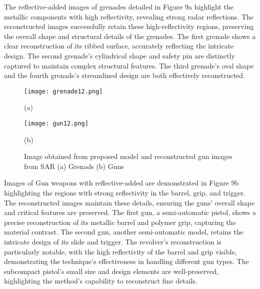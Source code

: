 \documentclass[journal,article,submit,pdftex,moreauthors]{Definitions/mdpi}
\begin{document}
The reflective-added images of grenades detailed in Figure 9a highlight the metallic components with high reflectivity, revealing strong radar reflections. The reconstructed images successfully retain these high-reflectivity regions, preserving the overall shape and structural details of the grenades. The first grenade shows a clear reconstruction of its ribbed surface, accurately reflecting the intricate design. The second grenade's cylindrical shape and safety pin are distinctly captured to maintain complex structural features. The third grenade's oval shape and the fourth grenade's streamlined design are both effectively reconstructed.





\begin{figure}[h]
    \centering
    \begin{minipage}{0.49\textwidth}
        \centering
        \texttt{[image: grenade12.png]}
        \caption*{(a)}
    \end{minipage}
    \hfill
    \begin{minipage}{0.49\textwidth}
        \centering
        \texttt{[image: gun12.png]}
        \caption*{(b)}
    \end{minipage}
    \caption{Image obtained from proposed model and reconstructed gun images from SAR (a) Grenads    (b) Guns}
    \label{fig:side_by_side}
\end{figure}














Images of Gun weapons with reflective-added are demonstrated in Figure 9b highlighting the regions with strong reflectivity in the barrel, grip, and trigger. The reconstructed images maintain these details, ensuring the guns' overall shape and critical features are preserved. The first gun, a semi-automatic pistol, shows a precise reconstruction of its metallic barrel and polymer grip, capturing the material contrast. The second gun, another semi-automatic model, retains the intricate design of its slide and trigger. The revolver's reconstruction is particularly notable, with the high reflectivity of the barrel and grip visible, demonstrating the technique's effectiveness in handling different gun types. The subcompact pistol’s small size and design elements are well-preserved, highlighting the method's capability to reconstruct fine details.
\end{document}
